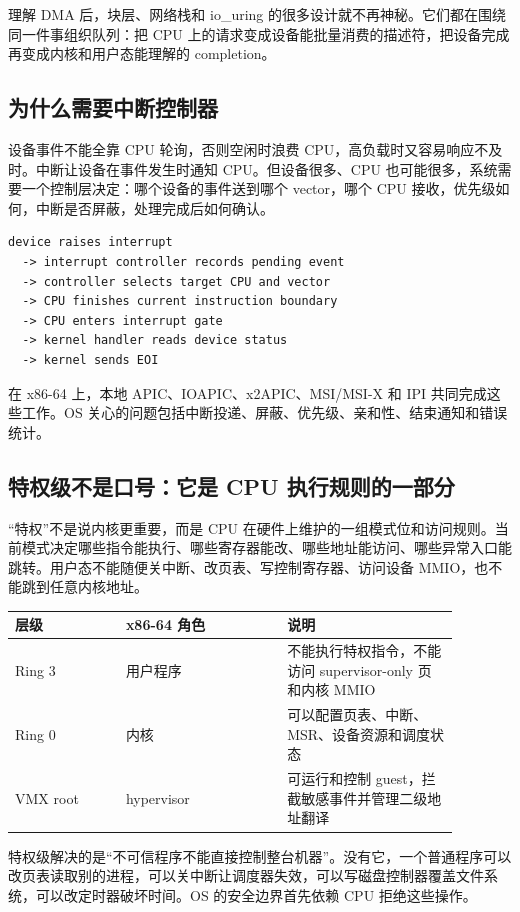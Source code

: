 理解 DMA 后，块层、网络栈和 io\_uring 的很多设计就不再神秘。它们都在围绕同一件事组织队列：把 CPU 上的请求变成设备能批量消费的描述符，把设备完成再变成内核和用户态能理解的 completion。

\subsection{为什么需要中断控制器}

设备事件不能全靠 CPU 轮询，否则空闲时浪费 CPU，高负载时又容易响应不及时。中断让设备在事件发生时通知 CPU。但设备很多、CPU 也可能很多，系统需要一个控制层决定：哪个设备的事件送到哪个 vector，哪个 CPU 接收，优先级如何，中断是否屏蔽，处理完成后如何确认。

\begin{lstlisting}
device raises interrupt
  -> interrupt controller records pending event
  -> controller selects target CPU and vector
  -> CPU finishes current instruction boundary
  -> CPU enters interrupt gate
  -> kernel handler reads device status
  -> kernel sends EOI
\end{lstlisting}

在 x86-64 上，本地 APIC、IOAPIC、x2APIC、MSI/MSI-X 和 IPI 共同完成这些工作。OS 关心的问题包括中断投递、屏蔽、优先级、亲和性、结束通知和错误统计。

\subsection{特权级不是口号：它是 CPU 执行规则的一部分}

“特权”不是说内核更重要，而是 CPU 在硬件上维护的一组模式位和访问规则。当前模式决定哪些指令能执行、哪些寄存器能改、哪些地址能访问、哪些异常入口能跳转。用户态不能随便关中断、改页表、写控制寄存器、访问设备 MMIO，也不能跳到任意内核地址。

\begin{longtable}{p{0.22\linewidth}p{0.32\linewidth}p{0.34\linewidth}}
\toprule
层级 & x86-64 角色 & 说明 \\
\midrule
Ring 3 & 用户程序 & 不能执行特权指令，不能访问 supervisor-only 页和内核 MMIO \\
Ring 0 & 内核 & 可以配置页表、中断、MSR、设备资源和调度状态 \\
VMX root & hypervisor & 可运行和控制 guest，拦截敏感事件并管理二级地址翻译 \\
\bottomrule
\end{longtable}

特权级解决的是“不可信程序不能直接控制整台机器”。没有它，一个普通程序可以改页表读取别的进程，可以关中断让调度器失效，可以写磁盘控制器覆盖文件系统，可以改定时器破坏时间。OS 的安全边界首先依赖 CPU 拒绝这些操作。

